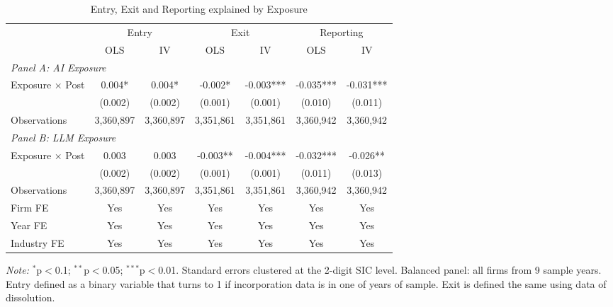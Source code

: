 \begin{table}[!h]
\centering
\caption{Entry, Exit and Reporting explained by Exposure}
\centering
\fontsize{10}{12}\selectfont
\begin{threeparttable}
\begin{tabular}[t]{lcccccc}
\toprule
\multicolumn{1}{c}{ } & \multicolumn{2}{c}{Entry} & \multicolumn{2}{c}{Exit} & \multicolumn{2}{c}{Reporting} \\
\cmidrule(l{3pt}r{3pt}){2-3} \cmidrule(l{3pt}r{3pt}){4-5} \cmidrule(l{3pt}r{3pt}){6-7}
 & OLS & IV & OLS & IV & OLS & IV\\
\midrule
\multicolumn{7}{l}{\textit{Panel A: AI Exposure}}\\
\hspace{1em}Exposure × Post & 0.004* & 0.004* & -0.002* & -0.003*** & -0.035*** & -0.031***\\
\hspace{1em} & (0.002) & (0.002) & (0.001) & (0.001) & (0.010) & (0.011)\\
\hspace{1em}Observations & 3,360,897 & 3,360,897 & 3,351,861 & 3,351,861 & 3,360,942 & \vphantom{1} 3,360,942\\
\multicolumn{7}{l}{\textit{Panel B: LLM Exposure}}\\
\hspace{1em}Exposure × Post & 0.003 & 0.003 & -0.003** & -0.004*** & -0.032*** & -0.026**\\
\hspace{1em} & (0.002) & (0.002) & (0.001) & (0.001) & (0.011) & (0.013)\\
\hspace{1em}Observations & 3,360,897 & 3,360,897 & 3,351,861 & 3,351,861 & 3,360,942 & 3,360,942\\
\midrule
Firm FE & Yes & Yes & Yes & Yes & Yes & Yes\\
Year FE & Yes & Yes & Yes & Yes & Yes & Yes\\
Industry FE & Yes & Yes & Yes & Yes & Yes & Yes\\
\midrule
\bottomrule
\end{tabular}
\begin{tablenotes}
\item  \textit{Note:} $^{*}$p$<$0.1; $^{**}$p$<$0.05; $^{***}$p$<$0.01. Standard errors clustered at the 2-digit SIC level. Balanced panel: all firms from 9 sample years. Entry defined as a binary variable that turns to 1 if incorporation data is in one of years of sample. Exit is defined the same using data of dissolution. 
\end{tablenotes}
\end{threeparttable}
\label{attrition}
\end{table}

